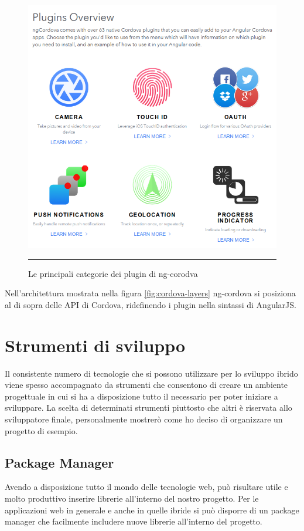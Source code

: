 \begin{figure}[ht]
  \centering
    \includegraphics[scale=0.66]{Figures/ngcordova-plugins.png} 
    \rule{35em}{0.5pt}
  \caption[ngCordova Plugin]{Le principali categorie dei plugin di ng-corodva}
  \label{fig:ngcordova-plugins}
\end{figure}

Nell'architettura mostrata nella figura \ref{fig:cordova-layers} ng-cordova si posiziona al di sopra delle API di Cordova, ridefinendo i plugin nella sintassi di AngularJS. 

\section{Strumenti di sviluppo}

Il consistente numero di tecnologie che si possono utilizzare per lo sviluppo ibrido viene spesso accompagnato da strumenti che consentono di creare un ambiente progettuale in cui si ha a disposizione tutto il necessario per poter iniziare a sviluppare. La scelta di determinati strumenti piuttosto che altri è riservata allo sviluppatore finale, personalmente mostrerò come ho deciso di organizzare un progetto di esempio.

\subsection{Package Manager}
\label{sec:package_manager}
Avendo a disposizione tutto il mondo delle tecnologie web, può risultare utile e molto produttivo inserire librerie all'interno del nostro progetto. Per le applicazioni web in generale e anche in quelle ibride si può disporre di un package manager che facilmente includere nuove librerie all'interno del progetto.\\

